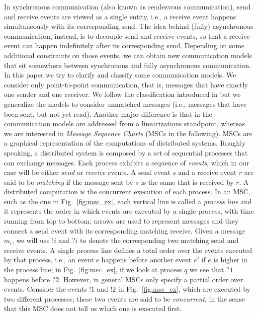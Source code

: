 


In synchronous communication (also known as rendezvous communication), send and receive events are  viewed as a single entity, i.e., a receive event  happens simultaneously with its corresponding send. The  idea behind (fully) asynchronous communication, instead, is to decouple send and receive events, so that a receive event can happen indefinitely after its corresponding send. Depending on some additional constraints on those events, we can obtain new communication models that sit somewhere between synchronous and fully asynchronous communication.
In this paper we try to clarify and classify some communication models.  We consider only point-to-point communication, that is, messages that have exactly one sender and one receiver.  We follow the classification introduced in \cite{DBLP:journals/fac/ChevrouHQ16} but we generalize the models to  consider unmatched messages (i.e., messages that have been sent, but not yet read). Another major difference is that in \cite{DBLP:journals/fac/ChevrouHQ16} the communication models are addressed from a linearizations standpoint, whereas we are interested in \emph{Message Sequence Charts} (MSCs in the following). 
MSCs  are a graphical representation of the  computations of distributed systems.  Roughly speaking, a distributed system is composed by a set of sequential processes that can exchange messages. Each process exhibits a sequence of \emph{events}, which in our case will be either \emph{send} or \emph{receive} events. A send event $s$ and a receive event $r$ are said to be \emph{matching} if the message sent by $s$ is the same  that is received by $r$. A distributed computation is the concurrent execution of each process. In an MSC, such as the one in Fig.~\ref{fig:msc_ex}, each vertical line is called a \emph{process line} and it represents the order in which events are executed by a single process, with time running from top to bottom; arrows are used to represent messages and they connect a send event with its corresponding matching receive. 
Given a message $m_i$, we will use $!i$ and $?i$ to denote the corresponding two matching send and receive events. A single process line defines a total order over the events executed by that process, i.e., an event $e$ happens before another event $e'$ if $e$ is higher in the process line; in Fig.~\ref{fig:msc_ex}, if we look at process $q$ we see that $?1$ happens before $?2$. However, in general MSCs only specify a partial order over events. Consider the events $!1$ and $!2$ in Fig.~\ref{fig:msc_ex}, which are executed by two different processes; these two events are said to be \emph{concurrent}, in the sense that this MSC does not tell us which one is executed first. 
